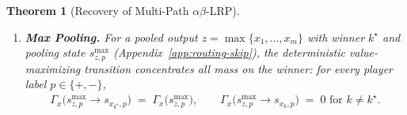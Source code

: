 \documentclass[twoside]{article}
\newcommand{\1}{\mathbf{1}}
\newtheorem{theorem}{Theorem}
\begin{document}
\begin{theorem}[Recovery of Multi-Path $\alpha\beta$-\ac{LRP}]
\begin{enumerate}
\begin{align}
            \Gamma_x\!\bigl(s^{\mathrm{add}}_{z,p}\to s_{x_{\mathrm{op}},p}\bigr) \;=\;
            \tfrac12\,\Gamma_x\!\bigl(s^{\mathrm{add}}_{z,p}\bigr),
            \qquad
            \Gamma_x\!\bigl(s^{\mathrm{add}}_{z,p}\to s_{y_{\mathrm{op}},p}\bigr) \;=\;
            \tfrac12\,\Gamma_x\!\bigl(s^{\mathrm{add}}_{z,p}\bigr),
        \end{align}
        so the operand pair carries the full addition-state mass with no duplication.
    \item \textbf{Max Pooling.} For a pooled output $z = \max\{x_1,\dots,x_m\}$ with winner $k^\star$ and
        pooling state $s_{z,p}^{\max}$ (Appendix~\ref{app:routing-skip}), the deterministic
        value-maximizing transition concentrates all mass on the winner: for every player label $p \in
            \{+,-\}$,
        \begin{align}
            \Gamma_x\!\bigl(s^{\max}_{z,p}\to s_{x_{k^\star},p}\bigr) \;=\;
            \Gamma_x\!\bigl(s_{z,p}^{\max}\bigr),
            \qquad
            \Gamma_x\!\bigl(s^{\max}_{z,p}\to s_{x_{k},p}\bigr) \;=\; 0 \text{ for } k \neq k^\star.
        \end{align}
\end{enumerate}
\end{theorem}
\end{document}
